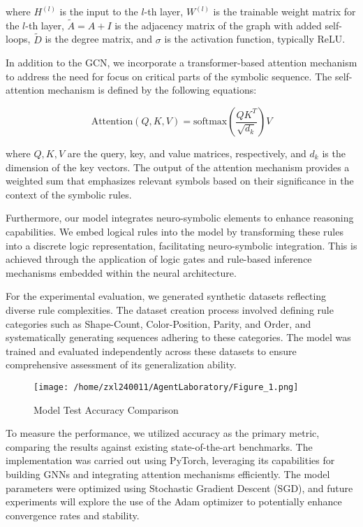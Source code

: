 \documentclass{article}
\begin{document}
where \( H^{(l)} \) is the input to the \( l \)-th layer, \( W^{(l)} \) is the trainable weight matrix for the \( l \)-th layer, \( \tilde{A} = A + I \) is the adjacency matrix of the graph with added self-loops, \( \tilde{D} \) is the degree matrix, and \( \sigma \) is the activation function, typically ReLU.

In addition to the GCN, we incorporate a transformer-based attention mechanism to address the need for focus on critical parts of the symbolic sequence. The self-attention mechanism is defined by the following equations:

\[
\text{Attention}(Q, K, V) = \text{softmax}\left(\frac{QK^T}{\sqrt{d_k}}\right)V
\]

where \( Q, K, V \) are the query, key, and value matrices, respectively, and \( d_k \) is the dimension of the key vectors. The output of the attention mechanism provides a weighted sum that emphasizes relevant symbols based on their significance in the context of the symbolic rules.

Furthermore, our model integrates neuro-symbolic elements to enhance reasoning capabilities. We embed logical rules into the model by transforming these rules into a discrete logic representation, facilitating neuro-symbolic integration. This is achieved through the application of logic gates and rule-based inference mechanisms embedded within the neural architecture.

For the experimental evaluation, we generated synthetic datasets reflecting diverse rule complexities. The dataset creation process involved defining rule categories such as Shape-Count, Color-Position, Parity, and Order, and systematically generating sequences adhering to these categories. The model was trained and evaluated independently across these datasets to ensure comprehensive assessment of its generalization ability.

\begin{figure}[h]
\caption{Model Test Accuracy Comparison}
\centering
\texttt{[image: /home/zxl240011/AgentLaboratory/Figure\_1.png]}
\label{fig:fig1}
\end{figure}

To measure the performance, we utilized accuracy as the primary metric, comparing the results against existing state-of-the-art benchmarks. The implementation was carried out using PyTorch, leveraging its capabilities for building GNNs and integrating attention mechanisms efficiently. The model parameters were optimized using Stochastic Gradient Descent (SGD), and future experiments will explore the use of the Adam optimizer to potentially enhance convergence rates and stability.
\end{document}

